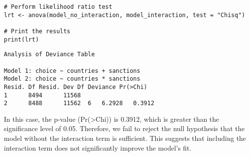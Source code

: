 \documentclass[12pt,letterpaper]{article}
\begin{document}
\begin{enumerate}
\begin{enumerate}
\begin{lstlisting}
# Perform likelihood ratio test
lrt <- anova(model_no_interaction, model_interaction, test = "Chisq")

# Print the results
print(lrt)
	\end{lstlisting}
	
	\begin{verbatim}
Analysis of Deviance Table

Model 1: choice ~ countries + sanctions
Model 2: choice ~ countries * sanctions
Resid. Df Resid. Dev Df Deviance Pr(>Chi)
1      8494      11568                     
2      8488      11562  6   6.2928   0.3912
	\end{verbatim}	
In this case, the p-value (Pr(>Chi)) is 0.3912, which is greater than the significance level of 0.05. Therefore, we fail to reject the null hypothesis that the model without the interaction term is sufficient. 
This suggests that including the interaction term does not significantly improve the model's fit.
			
	\end{enumerate}
	\end{enumerate}
\end{document}
